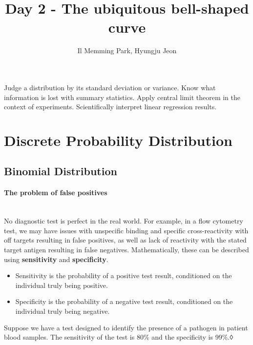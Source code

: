 \documentclass[a4paper,11pt]{exam}
\title{Day 2 - The ubiquitous bell-shaped curve}
\author{Il Memming Park, Hyungju Jeon}
\newcounter{ct}
\newcommand{\myparagraph}[1]{\paragraph{#1}\mbox{}\\}
\begin{document}
\maketitle
\begin{tcolorbox}[colback=black!1!,title=Learning Objective 2]
	Judge a distribution by its standard deviation or variance. Know what information is lost with summary statistics. Apply central limit theorem in the context of experiments. Scientifically interpret linear regression results.
\end{tcolorbox}
\section{Discrete Probability Distribution}
\subsection{Binomial Distribution}

\myparagraph{The problem of false positives} No diagnostic test is perfect in the real world.
For example, in a flow cytometry test, we may have issues with unspecific binding and specific cross-reactivity with off targets resulting in false positives, as well as lack of reactivity with the stated target antigen resulting in false negatives. Mathematically, these can be described using \textbf{sensitivity} and \textbf{specificity}.
\begin{itemize}
	\item Sensitivity is the probability of a positive test result, conditioned on the individual truly being positive.
	\item Specificity is the probability of a negative test result, conditioned on the individual truly being negative.
\end{itemize}

Suppose we have a test designed to identify the presence of a pathogen in patient blood samples. The sensitivity of the test is 80\% and the specificity is 99\%.◊
\end{document}
